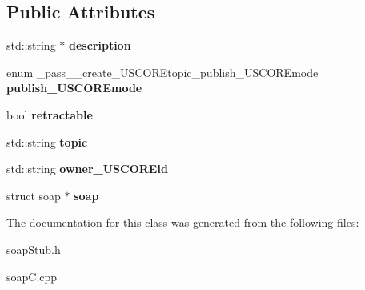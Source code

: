 \subsection*{Public Attributes}
\begin{DoxyCompactItemize}
\item 
\hypertarget{class__pass____create__USCOREtopic_a1e410b88a8d2b62e46882f3b5b2342c0}{
std::string $\ast$ {\bfseries description}}
\label{class__pass____create__USCOREtopic_a1e410b88a8d2b62e46882f3b5b2342c0}

\item 
\hypertarget{class__pass____create__USCOREtopic_aced32f6c7684d7b63ba1429c881249ad}{
enum \_\-pass\_\-\_\-create\_\-USCOREtopic\_\-publish\_\-USCOREmode {\bfseries publish\_\-USCOREmode}}
\label{class__pass____create__USCOREtopic_aced32f6c7684d7b63ba1429c881249ad}

\item 
\hypertarget{class__pass____create__USCOREtopic_a2890184a81d43961d0f2d2d99fc784dc}{
bool {\bfseries retractable}}
\label{class__pass____create__USCOREtopic_a2890184a81d43961d0f2d2d99fc784dc}

\item 
\hypertarget{class__pass____create__USCOREtopic_a9661b9b75446d16e157c78433d66f03d}{
std::string {\bfseries topic}}
\label{class__pass____create__USCOREtopic_a9661b9b75446d16e157c78433d66f03d}

\item 
\hypertarget{class__pass____create__USCOREtopic_afa31ad2900ccaff60cdf8b8d6f0c0714}{
std::string {\bfseries owner\_\-USCOREid}}
\label{class__pass____create__USCOREtopic_afa31ad2900ccaff60cdf8b8d6f0c0714}

\item 
\hypertarget{class__pass____create__USCOREtopic_a62942ec4b99a5bd76b114e25634f9fb3}{
struct soap $\ast$ {\bfseries soap}}
\label{class__pass____create__USCOREtopic_a62942ec4b99a5bd76b114e25634f9fb3}

\end{DoxyCompactItemize}


The documentation for this class was generated from the following files:\begin{DoxyCompactItemize}
\item 
soapStub.h\item 
soapC.cpp\end{DoxyCompactItemize}
